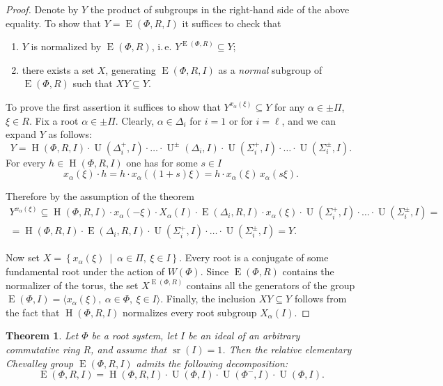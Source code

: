 \documentclass[11pt]{amsart}
\theoremstyle{plain}
\newtheorem{thm}{Theorem}
\numberwithin{equation}{section}
\numberwithin{lemma}{section}
\theoremstyle{definition}
\theoremstyle{remark}
\DeclareMathOperator{\E}{E}
\DeclareMathOperator{\Hh}{H}
\DeclareMathOperator{\U}{U}
\DeclareMathOperator{\sr}{sr}
\begin{document}
\begin{proof}
Denote by $Y$ the product of subgroups in the right-hand side of the above equality.
To show that $Y=\E(\Phi, R, I)$ it suffices to check that
\begin{enumerate}
\item $Y$ is normalized by $\E(\Phi, R)$, i.\,e. $Y^{\E(\Phi, R)}\subseteq Y$;
\item there exists a set $X$, generating $\E(\Phi, R, I)$ as a \emph{normal} subgroup of $\E(\Phi, R)$ such that $XY\subseteq Y$.
\end{enumerate}
To prove the first assertion it suffices to show that $Y^{x_\alpha(\xi)} \subseteq Y$ for any $\alpha\in \pm \Pi$, $\xi\in R$.
Fix a root $\alpha\in\pm\Pi$. Clearly, $\alpha \in \Delta_i$ for $i=1$ or for $i=\ell$, and we can expand $Y$ as follows:
\[ Y=\Hh(\Phi, R, I) \cdot \U(\Delta_i^+, I) \cdot \ldots \cdot \U^\pm(\Delta_i, I) \cdot \U(\Sigma_i^+, I) \cdot \ldots \cdot \U(\Sigma_i^\pm, I). \]
For every  $h \in \Hh(\Phi, R, I)$ one has for some $s\in I$
\[ x_\alpha(\xi)\cdot h = h\cdot x_\alpha((1+s)\xi)=h\cdot x_\alpha(\xi)\, x_\alpha(s\xi). \]

Therefore by the assumption of the theorem
\begin{multline*}
Y^{x_\alpha(\xi)} \subseteq \Hh(\Phi, R, I) \cdot x_\alpha(-\xi) \cdot X_{\alpha}(I) \cdot \E(\Delta_i, R, I)\cdot x_\alpha(\xi) \cdot \U(\Sigma^+_i, I) \cdot \ldots \cdot \U(\Sigma^\pm_i, I) =\\
= \Hh(\Phi, R, I) \cdot \E(\Delta_i, R, I) \cdot \U(\Sigma^+_i, I) \cdot \ldots \cdot \U(\Sigma^\pm_i, I) = Y.
\end{multline*}

Now set $X=\left\{x_\alpha(\xi)\ \middle|\ \alpha\in\Pi, \ \xi\in I \right\}$. 
Every root is a conjugate of some fundamental root under the action of $W(\Phi)$.
Since $\E(\Phi, R)$ contains the normalizer of the torus, the set $X^{\E(\Phi, R)}$ contains all the generators of the group $\E(\Phi, I) = \langle x_\alpha(\xi), \  \alpha\in\Phi, \ \xi\in I \rangle$.
Finally, the inclusion $XY \subseteq Y$ follows from the fact that $\Hh(\Phi, R, I)$ normalizes every root subgroup $X_\alpha(I)$.
\end{proof}
\begin{thm}\label{thm:srRI1}
Let $\Phi$ be a root system, let $I$ be an ideal of an arbitrary commutative ring $R$, and assume that $\sr(I)=1$.
Then the relative elementary Chevalley group $\E(\Phi, R, I)$ admits the following decomposition:
\[ \E(\Phi, R, I) = \Hh(\Phi, R, I) \cdot \U(\Phi, I) \cdot \U(\Phi^-, I) \cdot \U(\Phi, I). \]
\end{thm}
\end{document}

